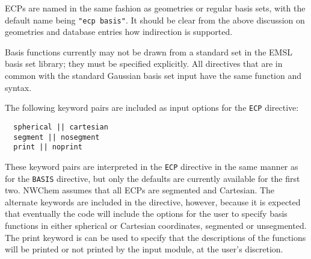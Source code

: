 
ECPs are named in the same fashion as geometries or regular basis
sets, with the default name being \verb+"ecp basis"+.  It should be
clear from the above discussion on geometries and database entries how
indirection is supported.


Basis functions currently may not be drawn from a standard set in the
EMSL basis set library; they must be specified explicitly.  All
directives that are in common with the standard Gaussian basis set
input have the same function and syntax.


The following keyword pairs are included as input options for the 
\verb+ECP+ directive:
\begin{verbatim}
  spherical || cartesian
  segment || nosegment
  print || noprint
\end{verbatim}

These keyword pairs are interpreted in the \verb+ECP+ directive in the
same manner as for the \verb+BASIS+ directive, but only the defaults
are currently available for the first two.  NWChem assumes that all
ECPs are segmented and Cartesian.  The alternate keywords are included
in the directive, however, because it is expected that eventually the
code will include the options for the user to specify basis functions
in either spherical or Cartesian coordinates, segmented or
unsegmented.  The print keyword is can be used to specify that the
descriptions of the functions will be printed or not printed by the
input module, at the user's discretion.

